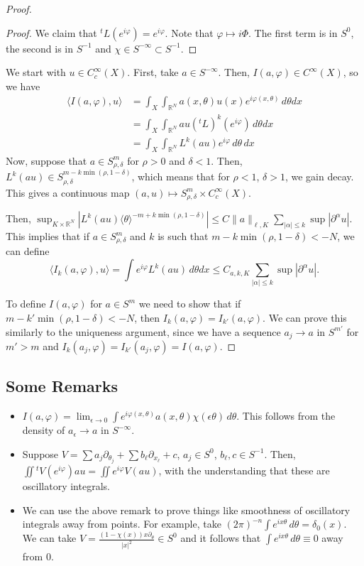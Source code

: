 \documentclass[12pt]{scrartcl}
\newcommand{\R}{\mathbb{R}}
\newcommand{\<}{\langle}
\renewcommand{\>}{\rangle}
\let \phi \varphi
\begin{document}
\begin{proof}
\begin{proof}
We claim that ${}^tL(e^{i\phi})= e^{i\phi}$. Note that $\phi \mapsto i\Phi$.  The first term is in $S^{0}$, the second is in $S^{-1}$ and $\chi \in S^{-\infty} \subset S^{-1}$.
\end{proof}
We start with $u \in C_c^\infty(X)$.  First, take $a \in S^{-\infty}$.  Then, $I(a, \phi) \in C^\infty(X)$, so we have
\begin{align*}
\<I(a, \phi), u\> &= \int_X \int_{\R^N} a(x, \theta) u(x)e^{i\phi(x, \theta)}\,d\theta dx \\
&= \int_X \int_{\R^N} au({}^t L)^k (e^{i\phi}) \,d\theta dx \\
&= \int_X \int_{\R^N} L^k(au) e^{i\phi}\, d\theta \,dx
\end{align*}
Now, suppose that $a \in S_{\rho, \delta}^m$ for $\rho > 0$ and $\delta < 1$.  Then, $L^k(au) \in S_{\rho, \delta}^{m-k \min(\rho, 1-\delta)}$, which means that for $\rho < 1$, $\delta > 1$, we gain decay.  This gives a continuous map $(a, u) \mapsto S_{\rho, \delta}^m \times C_c^\infty(X)$.

Then, $\sup_{K \times \R^N} |L^k(au) \<\theta\>^{-m + k \min(\rho, 1-\delta)}| \le C\|a\|_{\ell, K} \sum_{|\alpha| \le k} \sup |\partial^\alpha u|$.  This implies that if $a \in S_{\rho, \delta}^m$ and $k$ is such that $m-k \min(\rho, 1-\delta) < -N$, we can define
$$\<I_k(a, \phi), u\> = \int e^{i\phi} L^k(au)\,d\theta dx \le C_{a, k, K} \sum_{|\alpha| \le k} \sup |\partial^\alpha u|.$$

To define $I(a, \phi)$ for $a \in S^m$ we need to show that if $m - k' \min(\rho, 1- \delta) < -N$, then $I_k(a, \phi) = I_{k'}(a, \phi)$.  We can prove this similarly to the uniqueness argument, since we have a sequence $a_j \to a$ in $S^{m'}$ for $m' > m$ and $I_k(a_j, \phi) = I_{k'}(a_j, \phi) = I(a, \phi)$.
\end{proof}
\subsection{Some Remarks}
\begin{itemize}
\item $I(a, \phi) = \lim_{\epsilon \to 0} \int e^{i\phi(x, \theta)} a(x, \theta) \chi(\epsilon \theta)\,d\theta$.  This follows from the density of $a_\epsilon \to a$ in $S^{-\infty}$.
\item  Suppose $V = \sum a_j \partial_{\theta_j} + \sum b_\ell \partial_{x_\ell} + c$, $a_j \in S^0$, $b_{\ell}, c \in S^{-1}$.  Then, $\iint {}^t V(e^{i\phi}) au = \iint e^{i\phi} V(au)$, with the understanding that these are oscillatory integrals.  
\item We can use the above remark to prove things like smoothness of oscillatory integrals away from points.  For example, take $(2\pi)^{-n}\int e^{ix\theta}\,d\theta = \delta_0(x)$.  We can take $V = \frac{(1-\chi(x)) x\partial_\theta}{|x|^2} \in S^0$ and it follows that $\int e^{ix\theta}\,d\theta \equiv 0$ away from $0$.  
\end{itemize}
\pagebreak
\end{document}
